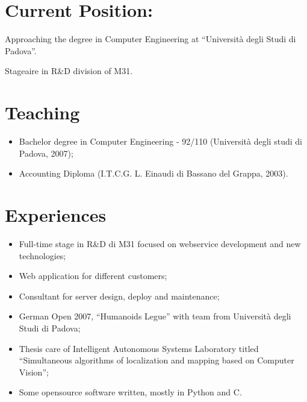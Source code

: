 \documentclass[pdftex, a4paper, 11pt]{article}
\begin{document}
\section*{Current Position:}

\hspace{0.58cm}Approaching the degree in Computer Engineering at ``Universit\`a degli Studi di Padova''. 

Stageaire in R\&D division of M31.



\section*{Teaching}
\begin{itemize}
\item Bachelor degree in Computer Engineering - 92/110 (Universit\`a degli studi di Padova, 2007);
\item Accounting Diploma (I.T.C.G. L. Einaudi di Bassano del Grappa, 2003).
\end{itemize}

\section*{Experiences}
\begin{itemize}
\item Full-time stage in R\&D di M31 focused on webservice development and new technologies;
\item Web application for different customers;
\item Consultant for server design, deploy and maintenance;
\item German Open 2007, ``Humanoids Legue'' with team from Universit\`a
degli Studi di Padova;
\item Thesis care of Intelligent Autonomous Systems Laboratory titled ``Simultaneous
algorithms of localization and mapping based on Computer Vision'';
\item Some opensource software written, mostly in Python and C.
\end{itemize}
\end{document}
